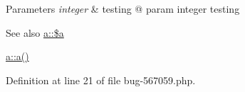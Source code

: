 \begin{DoxyParams}{\-Parameters}
{\em integer} & testing @ param integer testing \\
\hline
\end{DoxyParams}
\begin{DoxySeeAlso}{\-See also}
\hyperlink{classa_acebf83966ef6d7e5645a6b62ba368f9f}{a\-::\$a} 

\hyperlink{classa_a868083704107d6d05b69983f62cce171}{a\-::a()} 
\end{DoxySeeAlso}


\-Definition at line 21 of file bug-\/567059.\-php.


\begin{DoxyCode}
{}
\end{DoxyCode}
